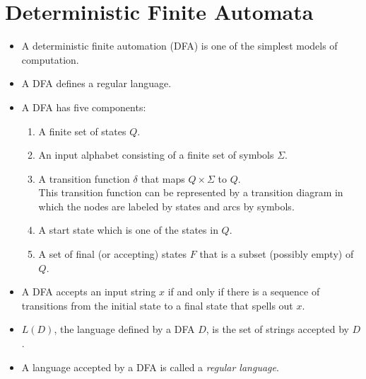 \documentclass[]{article}
\begin{document}
\section{Deterministic Finite Automata}
  \begin{itemize}
    \item A deterministic finite automation (DFA) is one of the simplest models 
    of computation.
    \item A DFA defines a regular language.
    \item A DFA has five components:
      \begin{enumerate}
        \item A finite set of states $Q$.
        \item An input alphabet consisting of a finite set of symbols $\Sigma$.
        \item A transition function $\delta$ that maps $Q \times \Sigma$ to $Q$.\\
        This transition function can be represented by a transition diagram in 
        which the nodes are labeled by states and arcs by symbols.
        \item A start state which is one of the states in $Q$.
        \item A set of final (or accepting) states $F$ that is a subset 
        (possibly empty) of $Q$.
      \end{enumerate}
    \item A DFA accepts an input string $x$ if and only if there is a sequence 
    of transitions from the initial state to a final state that spells out $x$.
    \item $L(D)$, the language defined by a DFA $D$, is the set of strings 
    accepted by $D$.
    \item A language accepted by a DFA is called a \emph{regular language}.
  \end{itemize}
  
\end{document}
